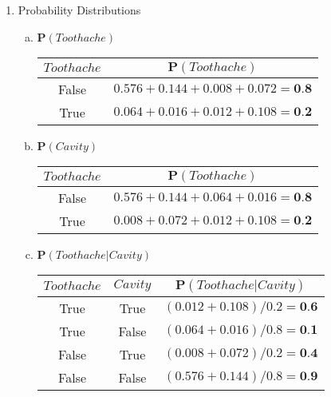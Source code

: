 \documentclass[10pt,draftclsnofoot,onecolumn]{IEEEtran}
\begin{document}
\begin{enumerate}
  \item Probability Distributions
  \begin{enumerate}[a)]
    \item \( \textbf{P}(Toothache) \)\\

    \begin{tabular}{|c|c|}
      \hline
      \( Toothache \) & \( \textbf{P}(Toothache) \) \\
      \hline
      False & \( 0.576 + 0.144 + 0.008 + 0.072 = \textbf{0.8} \) \\
      True  & \( 0.064 + 0.016 + 0.012 + 0.108 = \textbf{0.2} \) \\
      \hline
    \end{tabular} \medskip %

    \item \( \textbf{P}(Cavity) \) \\

    \begin{tabular}{|c|c|}
      \hline
      \( Toothache \) & \( \textbf{P}(Toothache) \) \\
      \hline
      False & \( 0.576 + 0.144 + 0.064 + 0.016 = \textbf{0.8} \) \\
      True  & \( 0.008 + 0.072 + 0.012 + 0.108 = \textbf{0.2} \) \\
      \hline
    \end{tabular} \medskip %

    \item \( \textbf{P}(Toothache | Cavity) \) \\

    \begin{tabular}{|c|c|c|}
      \hline
      \( Toothache \) & \( Cavity \) & \( \textbf{P}(Toothache | Cavity) \) \\
      \hline
      True  & True  & \( (0.012 + 0.108)/0.2 = \textbf{0.6} \) \\
      True  & False & \( (0.064 + 0.016)/0.8 = \textbf{0.1} \) \\
      False & True  & \( (0.008 + 0.072)/0.2 = \textbf{0.4} \) \\
      False & False & \( (0.576 + 0.144)/0.8 = \textbf{0.9} \) \\
      \hline
    \end{tabular} \medskip %
  \end{enumerate}


\end{enumerate}
\end{document}
